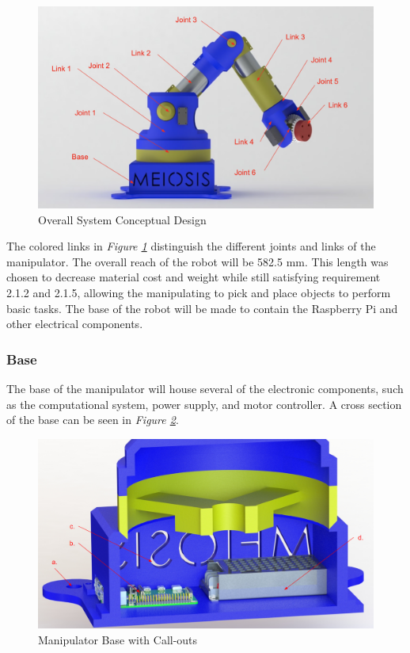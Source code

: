 \documentclass[12pt]{report}
\begin{document}
\begin{figure}[htp]
  \centering
  \includegraphics[frame, width=.75\textwidth]{overall_render}
  \caption{Overall System Conceptual Design }
  \label{fig:overall}
\end{figure}

The colored links in \emph{Figure \ref{fig:overall}} distinguish the different joints and links of the manipulator. The overall reach of the robot will be 582.5 mm. This length was chosen to decrease material cost and weight while still satisfying requirement 2.1.2 and 2.1.5, allowing the manipulating to pick and place objects to perform basic tasks. The base of the robot will be made to contain the Raspberry Pi and other electrical components.
\newpage
\subsubsection{Base}
The base of the manipulator will house several of the electronic components, such as the computational system, power supply, and motor controller. A cross section of the base can be seen in \emph{Figure \ref{fig:base}}.
\begin{figure}[htp]
  \centering
  \includegraphics[frame, width=.75\textwidth]{base_callouts}
  \caption{Manipulator Base with Call-outs}
  \label{fig:base}
\end{figure}
\end{document}
